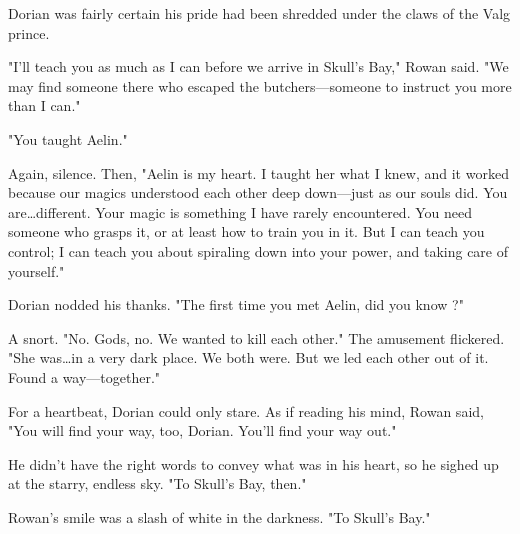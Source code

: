 Dorian was fairly certain his pride had been shredded under the claws of the Valg prince.

"I'll teach you as much as I can before we arrive in Skull's Bay," Rowan said.
"We may find someone there who escaped the butchers---someone to instruct you more than I can."

"You taught Aelin."

Again, silence.
Then, "Aelin is my heart.
I taught her what I knew, and it worked because our magics understood each other deep down---just as our souls did.
You are\ldots different.
Your magic is something I have rarely encountered.
You need someone who grasps it, or at least how to train you in it.
But I can teach you control; I can teach you about spiraling down into your power, and taking care of yourself."

Dorian nodded his thanks.
"The first time you met Aelin, did you know  ?"

A snort.
"No.
Gods, no.
We wanted to kill each other."
The amusement flickered.
"She was\ldots in a very dark place.
We both were.
But we led each other out of it.
Found a way---together."

For a heartbeat, Dorian could only stare.
As if reading his mind, Rowan said, "You will find your way, too, Dorian.
You'll find your way out."

He didn't have the right words to convey what was in his heart, so he sighed up at the starry, endless sky.
"To Skull's Bay, then."

Rowan's smile was a slash of white in the darkness.
"To Skull's Bay."
